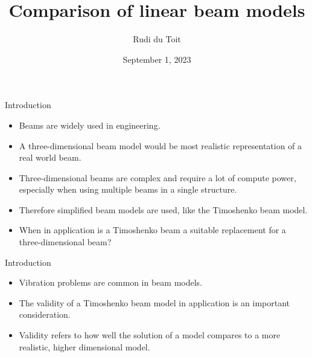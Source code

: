 \documentclass[8pt]{beamer}
\title{Comparison of linear beam models}
\author{Rudi du Toit}
\date{September 1, 2023}
\institute{University of Pretoria}
\begin{document}

\begin{frame}[plain]
\titlepage
\end{frame}

\begin{frame}{Introduction}
    \begin{itemize}
        \item Beams are widely used in engineering.
        \item A three-dimensional beam model would be most realistic representation of a real world beam.
        \item Three-dimensional beams are complex and require a lot of compute power, especially when using multiple beams in a single structure.
        \item Therefore simplified beam models are used, like the Timoshenko beam model.
        \item When in application is a Timoshenko beam a suitable replacement for a three-dimensional beam?
    \end{itemize}
\end{frame}

\begin{frame}{Introduction}
    \begin{itemize}
        \item Vibration problems are common in beam models.
        \item The validity of a Timoshenko beam model in application is an important consideration.
        \item Validity refers to how well the solution of a model compares to a more realistic, higher dimensional model.
    \end{itemize}
\end{frame}
\end{document}
